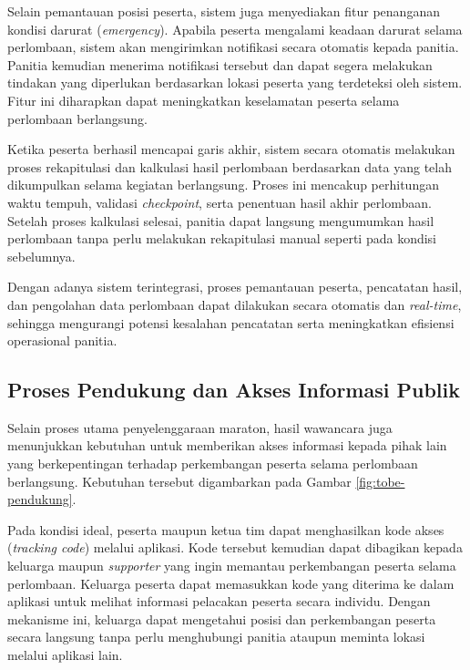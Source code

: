 Selain pemantauan posisi peserta, sistem juga menyediakan fitur penanganan kondisi darurat (\textit{emergency}). Apabila peserta mengalami keadaan darurat selama perlombaan, sistem akan mengirimkan notifikasi secara otomatis kepada panitia. Panitia kemudian menerima notifikasi tersebut dan dapat segera melakukan tindakan yang diperlukan berdasarkan lokasi peserta yang terdeteksi oleh sistem. Fitur ini diharapkan dapat meningkatkan keselamatan peserta selama perlombaan berlangsung.

Ketika peserta berhasil mencapai garis akhir, sistem secara otomatis melakukan proses rekapitulasi dan kalkulasi hasil perlombaan berdasarkan data yang telah dikumpulkan selama kegiatan berlangsung. Proses ini mencakup perhitungan waktu tempuh, validasi \textit{checkpoint}, serta penentuan hasil akhir perlombaan. Setelah proses kalkulasi selesai, panitia dapat langsung mengumumkan hasil perlombaan tanpa perlu melakukan rekapitulasi manual seperti pada kondisi sebelumnya.

Dengan adanya sistem terintegrasi, proses pemantauan peserta, pencatatan hasil, dan pengolahan data perlombaan dapat dilakukan secara otomatis dan \textit{real-time}, sehingga mengurangi potensi kesalahan pencatatan serta meningkatkan efisiensi operasional panitia.






\subsection{Proses Pendukung dan Akses Informasi Publik}

Selain proses utama penyelenggaraan maraton, hasil wawancara juga menunjukkan kebutuhan untuk memberikan akses informasi kepada pihak lain yang berkepentingan terhadap perkembangan peserta selama perlombaan berlangsung. Kebutuhan tersebut digambarkan pada Gambar \ref{fig:tobe-pendukung}.

Pada kondisi ideal, peserta maupun ketua tim dapat menghasilkan kode akses (\textit{tracking code}) melalui aplikasi. Kode tersebut kemudian dapat dibagikan kepada keluarga maupun \textit{supporter} yang ingin memantau perkembangan peserta selama perlombaan. Keluarga peserta dapat memasukkan kode yang diterima ke dalam aplikasi untuk melihat informasi pelacakan peserta secara individu. Dengan mekanisme ini, keluarga dapat mengetahui posisi dan perkembangan peserta secara langsung tanpa perlu menghubungi panitia ataupun meminta lokasi melalui aplikasi lain.


